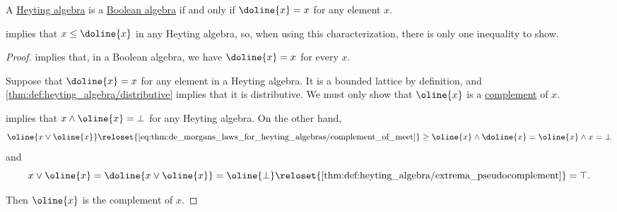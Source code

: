 \begin{proposition}\label{thm:boolean_algebra_heyting_characterization}
  A \hyperref[def:heyting_algebra]{Heyting algebra} is a \hyperref[def:boolean_algebra]{Boolean algebra} if and only if \( \doline{x} = x \) for any element \( x \).
\end{proposition}
\begin{comments}
  \item {} implies that \( x \leq \doline{x} \) in any Heyting algebra, so, when using this characterization, there is only one inequality to show.
\end{comments}
\begin{proof}
  \SufficiencySubProof {} implies that, in a Boolean algebra, we have \( \doline{x} = x \) for every \( x \).

  \NecessitySubProof Suppose that \( \doline{x} = x \) for any element in a Heyting algebra. It is a bounded lattice by definition, and \cref{thm:def:heyting_algebra/distributive} implies that it is distributive. We must only show that \( \oline{x} \) is a \hyperref[def:bounded_lattice_complement]{complement} of \( x \).

   implies that \( x \wedge \oline{x} = \bot \) for any Heyting algebra. On the other hand,
  \begin{equation*}
    \oline{x \vee \oline{x}}
    \reloset {\eqref{eq:thm:de_morgans_laws_for_heyting_algebras/complement_of_meet}} \geq
    \oline{x} \wedge \doline{x}
    =
    \oline{x} \wedge x
    =
    \bot
  \end{equation*}
  and
  \begin{equation*}
    x \vee \oline{x}
    =
    \doline{x \vee \oline{x}}
    =
    \oline{\bot}
    \reloset {\ref{thm:def:heyting_algebra/extrema_pseudocomplement}} =
    \top.
  \end{equation*}

  Then \( \oline{x} \) is the complement of \( x \).
\end{proof}

